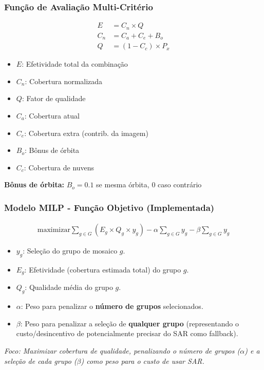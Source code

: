 \documentclass{beamer}
\begin{document}
\begin{frame}
    \frametitle{Função de Avaliação Multi-Critério}
    \begin{align}
    E &= C_n \times Q \\
    C_n &= C_a + C_e + B_o \\
    Q &= (1 - C_c) \times P_x
    \end{align}

    \begin{itemize}
        \item $E$: Efetividade total da combinação
        \item $C_n$: Cobertura normalizada
        \item $Q$: Fator de qualidade
        \item $C_a$: Cobertura atual
        \item $C_e$: Cobertura extra (contrib. da imagem)
        \item $B_o$: Bônus de órbita
        \item $C_c$: Cobertura de nuvens
    \end{itemize}
    
    \textbf{Bônus de órbita:}
    $B_o = 0.1$ se mesma órbita, $0$ caso contrário
\end{frame}

\begin{frame}
    \frametitle{Modelo MILP - Função Objetivo (Implementada)} %

    \begin{align}
    \textrm{maximizar} \sum_{g \in G} (E_g \times Q_g \times y_g) - \alpha \sum_{g \in G} y_g - \beta \sum_{g \in G} y_g \label{eq:obj_func_impl}
    \end{align}

    \begin{itemize}\setlength{\itemsep}{0pt}\small
        \item $y_g$: Seleção do grupo de mosaico $g$.
        \item $E_g$: Efetividade (cobertura estimada total) do grupo $g$.
        \item $Q_g$: Qualidade média do grupo $g$.
        \item $\alpha$: Peso para penalizar o \textbf{número de grupos} selecionados.
        \item $\beta$: Peso para penalizar a seleção de \textbf{qualquer grupo} (representando o custo/desincentivo de potencialmente precisar do SAR como fallback). %
    \end{itemize}
    \textit{\footnotesize Foco: Maximizar cobertura de qualidade, penalizando o número de grupos ($\alpha$) e a seleção de cada grupo ($\beta$) como peso para o custo de usar SAR.} %
\end{frame}
\end{document}
